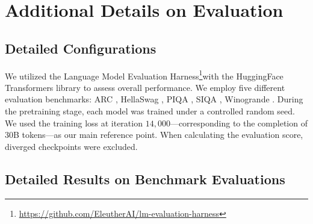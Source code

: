 


\newpage

\section{Additional Details on Evaluation} 
\label{appendix:morebenchmarks}

\subsection{Detailed Configurations}
We utilized the Language Model Evaluation Harness\footnote{\url{https://github.com/EleutherAI/lm-evaluation-harness}}with the HuggingFace Transformers library \citep{eval-harness, wolf-etal-2020-transformers} to assess overall performance. We employ five different evaluation benchmarks: ARC \citep{clark2018thinksolvedquestionanswering},  HellaSwag \citep{hellaswag}, PIQA \citep{bisk2020piqa}, SIQA \citep{siqa}, Winogrande \citep{sakaguchi2021wino}.  During the pretraining stage, each model was trained under a controlled random seed. We used the training loss at iteration $14,000$—corresponding to the completion of $30$B tokens—as our main reference point. When calculating the evaluation score, diverged checkpoints were excluded.

\subsection{Detailed Results on Benchmark Evaluations} \label{appendix:detailed_evals}

